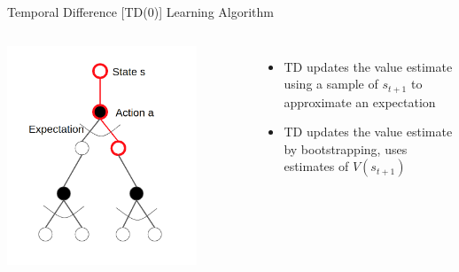 \documentclass[aspectratio=169]{../latex_main/tntbeamer}  %
\begin{document}
\begin{frame}[c]{Temporal Difference [TD(0)] Learning Algorithm}

\begin{columns}
	
	
	\includegraphics[width=0.8\textwidth]{images/td0.png}
	
	
	\begin{itemize}
		\item TD updates the value estimate using a sample of $s_{t+1}$ to approximate an expectation
		\item TD updates the value estimate by bootstrapping, uses estimates of $V(s_{t+1})$
	\end{itemize}
	
	
\end{columns}	

\end{frame}
\end{document}
